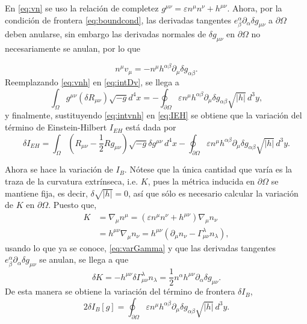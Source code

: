%
En \eqref{eq:vn} se uso la relaci\'{o}n de completez $g^{\mu \nu} = \varepsilon n^{\mu} n^{\nu} + h^{\mu \nu}$. Ahora, por la condici\'{o}n de frontera \eqref{eq:boundcond}, las derivadas tangentes $e^{\alpha}_{\beta} \partial_{\alpha} \delta g_{\mu \nu}$ a $\partial \Omega$ deben anularse, sin embargo las derivadas normales de $\delta g_{\mu \nu}$ en $\partial \Omega$ no necesariamente se anulan, por lo que

\begin{equation}
\label{eq:vnh}
n^{\mu} v_{\mu} = - n^{\mu} h^{\alpha \beta} \partial_{\mu} \delta g_{\alpha \beta}.
\end{equation}
%
Reemplazando \eqref{eq:vnh} en \eqref{eq:intDv}, se llega a
%
\begin{equation}
\label{eq:intvnh}
\int_{\Omega} g^{\mu \nu} (\delta R_{\mu \nu}) \sqrt{-g} d^4 x = - \oint_{\partial \Omega} \varepsilon n^{\mu} h^{\alpha \beta} \partial_{\mu} \delta g_{\alpha \beta} \sqrt{|h|} \, d^{3} y,
\end{equation}
%
y finalmente, sustituyendo \eqref{eq:intvnh} en \eqref{eq:IEH} se obtiene que la variaci\'{o}n del t\'{e}rmino de Einstein-Hilbert $I_{EH}$ est\'{a} dada por
%
\begin{equation}
\label{eq:varIEH}
\delta I_{EH} = \int_{\Omega} \left(R_{\mu \nu} - \frac{1}{2} R g_{\mu \nu} \right) \sqrt{-g} \delta g^{\mu \nu} \, d^{4} x - \oint_{\partial \Omega} \varepsilon n^{\mu} h^{\alpha \beta} \partial_{\mu} \delta g_{\alpha \beta} \sqrt{|h|} \, d^{3} y.
\end{equation}

Ahora se hace la variaci\'{o}n de $I_{B}$. N\'{o}tese que la \'{u}nica cantidad que var\'{i}a es la traza de la curvatura extr\'{i}nseca, i.e. $K$, pues la m\'{e}trica inducida en $\partial \Omega$ se mantiene fija, es decir, $\delta \sqrt{|h|} = 0$, as\'{i} que s\'{o}lo es necesario calcular la variaci\'{o}n de $K$ en $\partial \Omega$. Puesto que,
%
\begin{align}
\label{eq:definitionK}
K & = \nabla_{\mu} n^{\mu} = (\varepsilon n^{\mu} n^{\nu} + h^{\mu \nu}) \nabla_{\mu} n_{\nu} \nonumber \\
& = h^{\mu \nu} \nabla_{\mu} n_{\nu} = h^{\mu \nu} (\partial_{\mu} n_{\nu} - \Gamma^{\lambda}_{\mu \nu} n_{\lambda}),
\end{align}
%
usando lo que ya se conoce, \eqref{eq:varGamma} y que las derivadas tangentes $e^{\alpha}_{\beta} \partial_{\alpha} \delta g_{\mu \nu}$ se anulan, se llega a que
%
\begin{equation}
\label{eq:varK}
\delta K = -h^{\mu \nu} \delta \Gamma^{\lambda}_{\mu \nu} n_{\lambda} = \frac{1}{2} n^{\alpha} h^{\mu \nu} \partial_{\alpha} \delta g_{\mu \nu}.
\end{equation}
%
De esta manera se obtiene la variaci\'{o}n del t\'{e}rmino de frontera $\delta I_{B}$,
%
\begin{equation}
\label{eq:varIB}
2 \delta I_{B} [g] = \oint_{\partial \Omega} \varepsilon n^{\mu} h^{\alpha \beta} \partial_{\mu} \delta g_{\alpha \beta} \sqrt{|h|} \, d^{3} y.
\end{equation}

